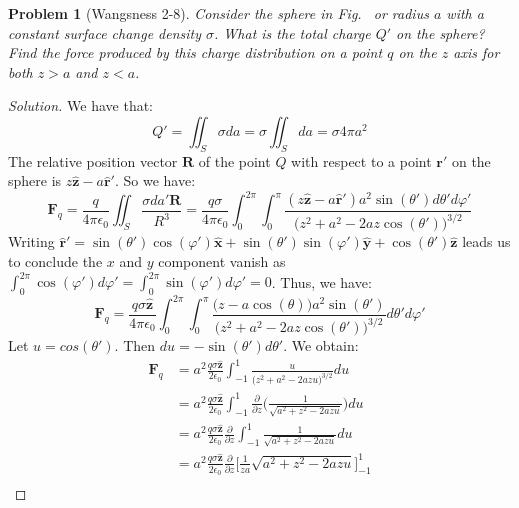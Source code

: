 \documentclass[oneside]{book}
\theoremstyle{mystyle}
\newtheorem{problem}{Problem}[section]
\begin{document}
\begin{problem}[Wangsness 2-8]
    Consider the sphere in Fig.~ or radius $a$ with a constant surface change density $\sigma$. What is the total charge $Q'$ on the sphere? Find the force produced by this charge distribution on a point $q$ on the $z$ axis for both $z>a$ and $z<a$.
\end{problem}
\begin{proof}[Solution]
We have that:
\begin{equation*}
    Q' = \iint_{S} \sigma da = \sigma \iint_{S}da = \sigma 4\pi a^{2}
\end{equation*}
The relative position vector $\mathbf{R}$ of the point $Q$ with respect to a point $\mathbf{r}'$ on the sphere is $z\hat{\mathbf{z}} - a\hat{\mathbf{r}}'$. So we have:
\begin{equation*}
    \mathbf{F}_q = \frac{q}{4\pi \epsilon_0} \iint_{S} \frac{\sigma da'\mathbf{R}}{R^3}=\frac{q\sigma}{4\pi \epsilon_0} \int_{0}^{2\pi} \int_{0}^{\pi} \frac{(z\hat{\mathbf{z}}-a\hat{\mathbf{r}}')a^2\sin(\theta')d\theta ' d\varphi '}{\big(z^2+a^2-2az\cos(\theta')\big)^{3/2}}    
\end{equation*}
Writing $\hat{\mathbf{r}}' = \sin(\theta')\cos(\varphi')\hat{\mathbf{x}} + \sin(\theta')\sin(\varphi')\hat{\mathbf{y}}+\cos(\theta')\hat{\mathbf{z}}$ leads us to conclude the $x$ and $y$ component vanish as $\int_{0}^{2\pi} \cos(\varphi')d\varphi' = \int_{0}^{2\pi}\sin(\varphi')d\varphi' = 0$. Thus, we have: 
\begin{equation*}
    \mathbf{F}_q = \frac{q\sigma\hat{\mathbf{z}}}{4\pi \epsilon_{0}}\int_{0}^{2\pi}\int_{0}^{\pi}\frac{\big(z-a\cos(\theta)\big)a^{2}\sin(\theta')}{\big(z^{2}+a^{2}-2az\cos(\theta')\big)^{3/2}}d\theta' d\varphi'
\end{equation*}
Let $u = cos(\theta')$. Then $du = -\sin(\theta')d\theta'$. We obtain:
\begin{align*}
    \mathbf{F}_{q} &= a^{2}\frac{q\sigma \hat{\mathbf{z}}}{2\epsilon_{0}}\int_{-1}^{1}\frac{u}{\big(z^{2}+a^{2}-2azu\big)^{3/2}}du\\
    &= a^{2}\frac{q\sigma \hat{\mathbf{z}}}{2\epsilon_{0}}\int_{-1}^{1}\frac{\partial}{\partial z} \bigg(\frac{1}{\sqrt{a^{2}+z^{2}-2azu}}\bigg)du\\
    &= a^{2}\frac{q\sigma \hat{\mathbf{z}}}{2\epsilon_{0}}\frac{\partial}{\partial z} \int_{-1}^{1}\frac{1}{\sqrt{a^{2}+z^{2}-2azu}}du\\
    &= a^{2}\frac{q\sigma \hat{\mathbf{z}}}{2\epsilon_{0}}\frac{\partial}{\partial z} \bigg[\frac{1}{za}\sqrt{a^{2}+z^{2}-2azu}\bigg]_{-1}^{1}\\

\end{align*}
\end{proof}
\end{document}
